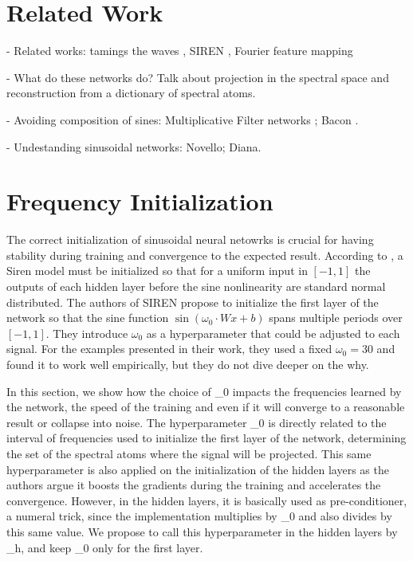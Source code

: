\section{Related Work}

- Related works: tamings the waves \cite{taming2017} , SIREN \cite{sitzmann2019siren}, Fourier feature mapping \cite{tancik2020fourfeat}

- What do these networks do? Talk about projection in the spectral space and reconstruction from a dictionary of spectral atoms.

- Avoiding composition of sines: Multiplicative Filter networks \cite{fathony2020multiplicative}; Bacon \cite{bacon2021}.

- Undestanding sinusoidal networks: Novello; Diana.


\section{Frequency Initialization}

The correct initialization of sinusoidal neural netowrks is crucial for having stability during training and convergence to the expected result. According to \cite{sitzmann2019siren}, a Siren model must be initialized so that for a uniform input in $[-1, 1]$ the outputs of each hidden layer before the sine nonlinearity are standard normal distributed. The authors of SIREN propose to initialize the first layer of the network so that the sine function $\sin(\omega_0 \cdot W x + b)$
spans multiple periods over $[-1, 1]$. They introduce $\omega_0$ as a hyperparameter that could be adjusted to each signal. For the examples presented in their work, they used a fixed $\omega_0=30$ and found it to work well empirically, but they do not dive deeper on the why. 

In this section, we show how the choice of \omega_0  impacts the frequencies learned by the network, the speed of the training and even if it will converge to a reasonable result or collapse into noise. The hyperparameter \omega_0 is directly related to the interval of frequencies used to initialize the first layer of the network, determining the set of the spectral atoms where the signal will be projected. This same hyperparameter is also applied on the initialization of the hidden layers as the authors argue it boosts the gradients during the training and accelerates the convergence. However, in the hidden layers, it is basically used as pre-conditioner, a numeral trick, since the implementation multiplies by \omega_0 and also divides by this same value. We propose to call this hyperparameter in the hidden layers by \omega_h, and keep \omega_0 only for the first layer.


